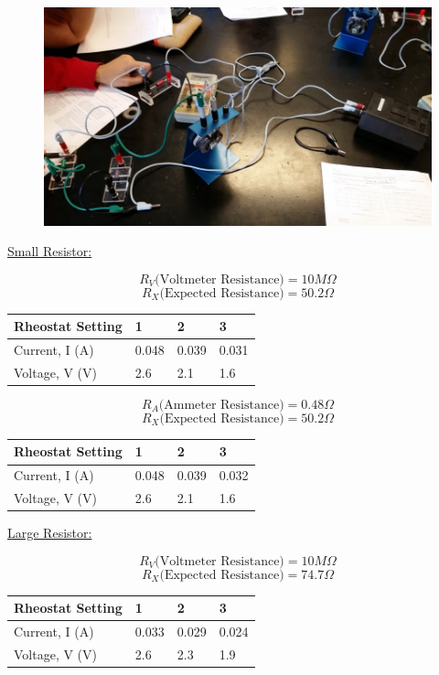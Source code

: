 \documentclass[11pt, titlepage]{article}
\begin{document}
\begin{figure}[h]
\centering
\hspace*{0cm}
\includegraphics[scale=0.7, angle=270]{lab13.jpg}
\vspace*{0cm}
\end{figure}

\underline{Small Resistor:}
\begin{center}
$$R_V \text{(Voltmeter Resistance)}= 10 M\Omega$$
$$R_X \text{(Expected Resistance)}= 50.2 \Omega$$
\begin{tabular}
{|m{9em}|m{7em}|m{7em}|m{7em}|}
\hline
Rheostat Setting & 1 & 2 & 3 \\
\hline
Current, I (A) & 0.048 & 0.039 & 0.031 \\
\hline
Voltage, V (V) & 2.6 & 2.1 & 1.6 \\
\hline
\end{tabular}
\end{center}

\begin{center}
$$R_A \text{(Ammeter Resistance)}= 0.48 \Omega$$
$$R_X \text{(Expected Resistance)}= 50.2 \Omega$$
\begin{tabular}
{|m{9em}|m{7em}|m{7em}|m{7em}|}
\hline
Rheostat Setting & 1 & 2 & 3 \\
\hline
Current, I (A) & 0.048 & 0.039 & 0.032 \\
\hline
Voltage, V (V) & 2.6 & 2.1 & 1.6 \\
\hline
\end{tabular}
\end{center}

\underline{Large Resistor:}
\begin{center}
$$R_V \text{(Voltmeter Resistance)}= 10 M\Omega$$
$$R_X \text{(Expected Resistance)}= 74.7 \Omega$$
\begin{tabular}
{|m{9em}|m{7em}|m{7em}|m{7em}|}
\hline
Rheostat Setting & 1 & 2 & 3 \\
\hline
Current, I (A) & 0.033 & 0.029 & 0.024 \\
\hline
Voltage, V (V) & 2.6 & 2.3 & 1.9 \\
\hline
\end{tabular}
\end{center}
\end{document}
